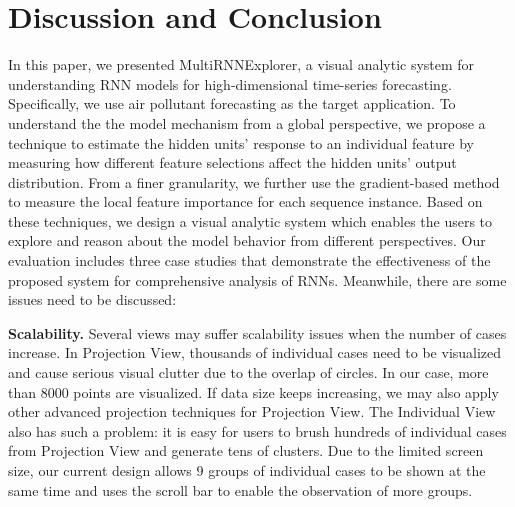 \section{Discussion and Conclusion}

In this paper, we presented MultiRNNExplorer, a visual analytic system for understanding RNN models for high-dimensional time-series forecasting.
Specifically, we use air pollutant forecasting as the target application. 
To understand the the model mechanism from a global perspective, we propose a technique to estimate the hidden units' response to an individual feature by measuring how different feature selections affect the hidden units' output distribution. 
From a finer granularity, we further use the gradient-based method to measure the local feature importance for each sequence instance. 
Based on these techniques, we design a visual analytic system which enables the users to explore and reason about the model behavior from different perspectives. 
Our evaluation includes three case studies that demonstrate the effectiveness of the proposed system for comprehensive analysis of RNNs.
Meanwhile, there are some issues need to be discussed:

\textbf{Scalability.}
Several views may suffer scalability issues when the number of cases increase. 
In Projection View, thousands of individual cases need to be visualized and cause serious visual clutter due to the overlap of circles.  
In our case, more than 8000 points are visualized. 
If data size keeps increasing, we may also apply other advanced projection techniques\cite{van2017visual, pezzotti2016hierarchical} for Projection View. 
The Individual View also has such a problem: it is easy for users to brush hundreds of individual cases from Projection View and generate tens of clusters. 
Due to the limited screen size, our current design allows 9 groups of individual cases to be shown at the same time and uses the scroll bar to enable the observation of more groups.

